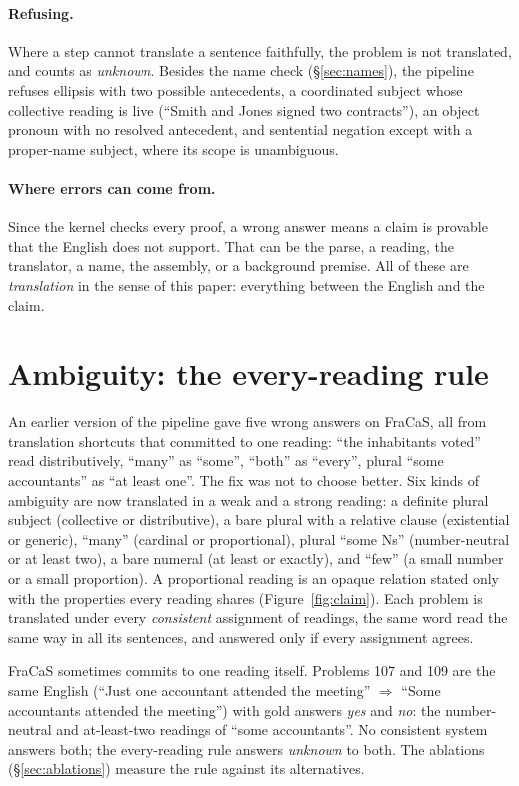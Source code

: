 \documentclass[11pt]{article}
\newcommand{\yes}{\textit{yes}}
\newcommand{\no}{\textit{no}}
\newcommand{\unk}{\textit{unknown}}
\begin{document}
\paragraph{Refusing.} Where a step cannot translate a sentence
faithfully, the problem is not translated, and counts as \unk{}. Besides
the name check (\S\ref{sec:names}), the pipeline refuses ellipsis with
two possible antecedents, a coordinated subject whose collective reading
is live (``Smith and Jones signed two contracts''), an object pronoun
with no resolved antecedent, and sentential negation except with a
proper-name subject, where its scope is unambiguous.

\paragraph{Where errors can come from.} Since the kernel checks every
proof, a wrong answer means a claim is provable that the English does
not support. That can be the parse, a reading, the translator, a name,
the assembly, or a background premise. All of these are
\emph{translation} in the sense of this paper: everything between the
English and the claim.

\section{Ambiguity: the every-reading rule}
\label{sec:readings}

An earlier version of the pipeline gave five wrong answers on FraCaS,
all from translation shortcuts that committed to one reading: ``the
inhabitants voted'' read distributively, ``many'' as ``some'', ``both''
as ``every'', plural ``some accountants'' as ``at least one''. The fix
was not to choose better. Six kinds of ambiguity are now translated in
a weak and a strong reading: a definite plural subject (collective or
distributive), a bare plural with a relative clause (existential or
generic), ``many'' (cardinal or proportional), plural ``some Ns''
(number-neutral or at least two), a bare numeral (at least or exactly),
and ``few'' (a small number or a small proportion). A proportional
reading is an opaque relation stated only with the properties every
reading shares (Figure~\ref{fig:claim}). Each problem is translated
under every \emph{consistent} assignment of readings, the same word read
the same way in all its sentences, and answered only if every assignment
agrees.

FraCaS sometimes commits to one reading itself. Problems 107 and 109
are the same English (``Just one accountant attended the meeting''
$\Rightarrow$ ``Some accountants attended the meeting'') with gold
answers \yes{} and \no{}: the number-neutral and at-least-two readings of
``some accountants''. No consistent system answers both; the
every-reading rule answers \unk{} to both. The ablations
(\S\ref{sec:ablations}) measure the rule against its alternatives.
\end{document}
